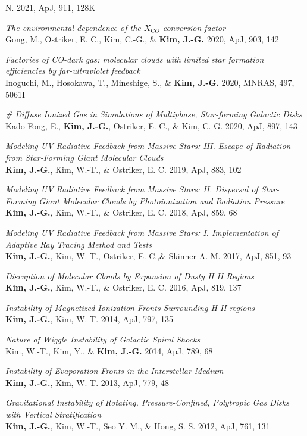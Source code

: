 \begin{benumerate}{20}
  N. 2021, ApJ, 911, 128K
\item \textit{The environmental dependence of the $X_{\mathrm CO}$ conversion
    factor}\\ Gong, M., Ostriker, E. C., Kim, C.-G., \& \textbf{Kim,
    J.-G.} 2020, ApJ, 903, 142
\item \textit{Factories of CO-dark gas: molecular clouds with limited star
formation efficiencies by far-ultraviolet feedback} \\
  Inoguchi, M., Hosokawa, T., Mineshige, S., \& \textbf{Kim, J.-G.} 2020, MNRAS,
  497, 5061I
\item \textit{\# Diffuse Ionized Gas in Simulations of Multiphase, Star-forming
    Galactic Disks}\\
  Kado-Fong, E., \textbf{Kim, J.-G.}, Ostriker, E. C., \& Kim, C.-G. 2020, ApJ,
  897, 143
\item \textit{Modeling UV Radiative Feedback from Massive Stars: III. Escape
    of Radiation from Star-Forming Giant Molecular Clouds} \\ \textbf{Kim,
    J.-G.}, Kim, W.-T., \& Ostriker, E. C. 2019, ApJ, 883, 102
\item \textit{Modeling UV Radiative Feedback from Massive Stars: II. Dispersal
of Star-Forming Giant Molecular Clouds by Photoionization and Radiation
Pressure} \\ \textbf{Kim, J.-G.}, Kim, W.-T., \& Ostriker, E. C. 2018, ApJ, 859,
68
\item \textit{Modeling UV Radiative Feedback from Massive Stars: I.
Implementation of Adaptive Ray Tracing Method and Tests}\\ \textbf{Kim, J.-G.},
Kim, W.-T., Ostriker, E. C.,\& Skinner A. M. 2017, ApJ, 851, 93
\item \textit{Disruption of Molecular Clouds by Expansion of Dusty H II
Regions}\\ \textbf{Kim, J.-G.}, Kim, W.-T., \& Ostriker, E. C. 2016, ApJ, 819,
137
\item \textit{Instability of Magnetized Ionization Fronts Surrounding H II
regions}\\ \textbf{Kim, J.-G.}, Kim, W.-T. 2014, ApJ, 797, 135
\item \textit{Nature of Wiggle Instability of Galactic Spiral Shocks}\\ Kim,
W.-T., Kim, Y., \& \textbf{Kim, J.-G.} 2014, ApJ, 789, 68
\item \textit{Instability of Evaporation Fronts in the Interstellar Medium}\\
  \textbf{Kim, J.-G.}, Kim, W.-T. 2013, ApJ, 779, 48
\item \textit{Gravitational Instability of Rotating, Pressure-Confined,
    Polytropic Gas Disks with Vertical Stratification} \\ \textbf{Kim, J.-G.},
  Kim, W.-T., Seo Y. M., \& Hong, S. S. 2012, ApJ, 761, 131
\end{benumerate}

